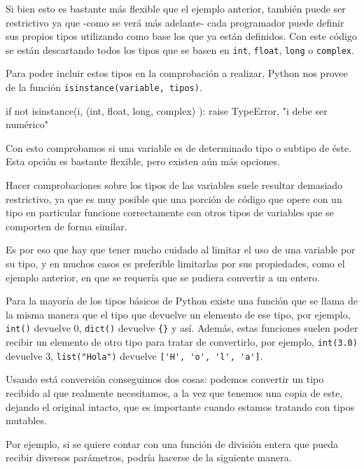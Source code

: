 Si bien esto es bastante más flexible que el ejemplo anterior, también puede
ser restrictivo ya que -como se verá más adelante- cada programador puede
definir sus propios tipos utilizando como base los que ya están definidos.
Con este código se están descartando todos los tipos que se basen en
\lstinline!int!, \lstinline!float!,
\lstinline!long! o \lstinline!complex!.

Para poder incluir estos tipos en la comprobación a realizar, Python nos
provee de la función \lstinline!isinstance(variable, tipos)!.

\begin{codigo-python-sn}
if not isinstance(i, (int, float, long, complex) ):
	raise TypeError, "i debe ser numérico"
\end{codigo-python-sn}

Con esto comprobamos si una variable es de determinado tipo o subtipo de
éste. Esta opción es bastante flexible, pero existen aún más opciones.

\begin{atencion}
Hacer comprobaciones sobre los tipos de las variables suele resultar
demasiado restrictivo, ya que es muy posible que una porción de código que
opere con un tipo en particular funcione correctamente con otros tipos de
variables que se comporten de forma similar.

Es por eso que hay que tener mucho cuidado al limitar el uso de una
variable por su tipo, y en muchos casos es preferible limitarlas por sus
propiedades, como el ejemplo anterior, en que se requería que se pudiera
convertir a un entero.
\end{atencion}

Para la mayoría de los tipos básicos de Python existe una función que se
llama de la misma manera que el tipo que devuelve un elemento de ese tipo,
por ejemplo, \lstinline!int()! devuelve 0, \lstinline!dict()! devuelve
\lstinline!{}! y así. Además, estas funciones suelen poder recibir un
elemento de otro tipo para tratar de convertirlo, por ejemplo,
\lstinline!int(3.0)! devuelve 3, \lstinline!list("Hola")! devuelve
\lstinline!['H', 'o', 'l', 'a']!.

Usando está conversión conseguimos dos cosas: podemos convertir un tipo
recibido al que realmente necesitamos, a la vez que tenemos una copia de
este, dejando el original intacto, que es importante cuando estamos
tratando con tipos mutables.

Por ejemplo, si se quiere contar con una función de división entera que
pueda recibir diversos parámetros, podría hacerse de la siguiente manera.

